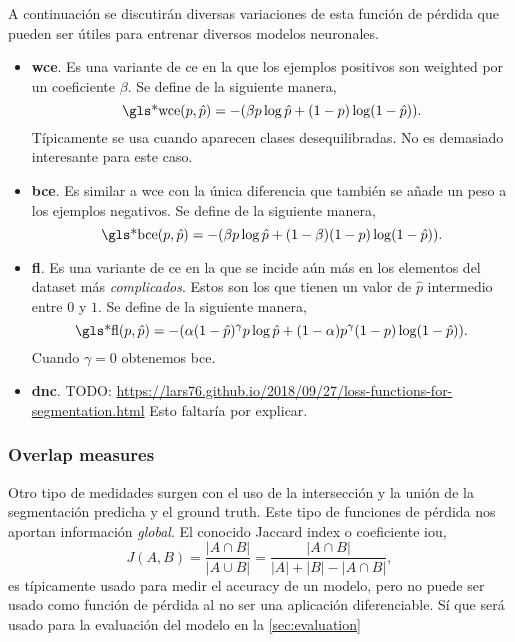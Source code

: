 A continuación se discutirán diversas variaciones de esta función de pérdida
que pueden ser útiles para entrenar diversos modelos neuronales.

\begin{itemize}
  \item \textbf{\gls*{wce}}. Es una variante de \gls{ce} en la que los ejemplos
  positivos son weighted por un coeficiente \(\beta\). Se define de la
  siguiente manera,
  \begin{equation}
    \text{\gls*{wce}}(p, \hat{p}) =
    -(\beta p\log\hat{p} + (1 - p)\log(1 - \hat{p})).
  \end{equation}
  Típicamente se usa cuando aparecen clases desequilibradas. No es demasiado
  interesante para este caso.
  \item \textbf{\gls*{bce}}. Es similar a \gls{wce} con la única diferencia que
  también se añade un peso a los ejemplos negativos. Se define de la siguiente
  manera,
  \begin{equation}
    \text{\gls*{bce}}(p, \hat{p}) =
    -(\beta p\log\hat{p} + (1 - \beta)(1 - p)\log(1 - \hat{p})).
  \end{equation}
  \item \textbf{\gls*{fl}}. Es una variante de \gls{ce} en la que se incide aún
  más en los elementos del dataset más \emph{complicados}. Estos son los que
  tienen un valor de \(\hat{p}\) intermedio entre \(0\) y \(1\). Se define de
  la siguiente manera,
  \begin{equation}
    \text{\gls*{fl}}(p, \hat{p}) =
    -(\alpha (1 - \hat{p})^\gamma p\log\hat{p} +
    (1 - \alpha)p^\gamma (1 - p)\log(1 - \hat{p})).
  \end{equation}
  Cuando \(\gamma = 0\) obtenemos \gls{bce}.
  \item \textbf{\gls*{dnc}}. TODO:
  \url{https://lars76.github.io/2018/09/27/loss-functions-for-segmentation.html} Esto
  faltaría por explicar.
\end{itemize}

\subsubsection{Overlap measures}
Otro tipo de medidades surgen con el uso de la intersección y la unión de la
segmentación predicha y el ground truth. Este tipo de funciones de pérdida nos
aportan información \emph{global}. El conocido Jaccard index o coeficiente \gls{iou},
\begin{equation}
  J(A,B) = \frac{|A \cap B|}{|A \cup B|}
  = \frac{|A \cap B|}{|A| + |B| - |A \cap B|},
\end{equation}
es típicamente usado para medir el accuracy de un modelo, pero no puede ser
usado como función de pérdida al no ser una aplicación diferenciable. Sí que
será usado para la evaluación del modelo en la \vref{sec:evaluation}

